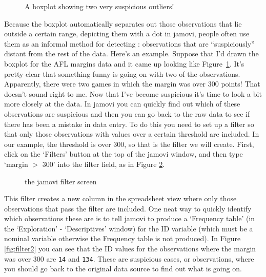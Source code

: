 \begin{figure}[!!htb]
\begin{center}
\caption{A boxplot showing two very suspicious outliers!}
\label{fig:boxplot4}
\end{center}
\end{figure}

Because the boxplot automatically separates out those observations that lie outside a certain range, depicting them with a dot in jamovi, people often use them as an informal method for detecting : observations that are ``suspiciously'' distant from the rest of the data. Here's an example. Suppose that I'd drawn the boxplot for the AFL margins data and it came up looking like Figure~\ref{fig:boxplot4}. It's pretty clear that something funny is going on with two of the observations. Apparently, there were two games in which the margin was over 300 points! That doesn't sound right to me. Now that I've become suspicious it's time to look a bit more closely at the data. In jamovi you can quickly find out which of these observations are suspicious and then you can go back to the raw data to see if there has been a mistake in data entry. To do this you need to set up a filter so that only those observations with values over a certain threshold are included. In our example, the threshold is over 300, so that is the filter we will create. First, click on the `Filters' button at the top of the jamovi window, and then type `margin $>$ 300' into the filter field, as in Figure \ref{fig:filter1}. 

\begin{figure}[htp]
\begin{center}
\caption{the jamovi filter screen}
\label{fig:filter1}
\end{center}
\end{figure}

This filter creates a new column in the spreadsheet view where only those observations that pass the filter are included. One neat way to quickly identify which observations these are is to tell jamovi to produce a `Frequency table' (in the `Exploration' - `Descriptives' window) for the ID variable (which must be a nominal variable otherwise the Frequency table is not produced). In Figure \ref{fig:filter2} you can see that the ID values for the observations where the margin was over 300 are \texttt{14} and \texttt{134}. These are suspicious cases, or observations, where you should go back to the original data source to find out what is going on.

